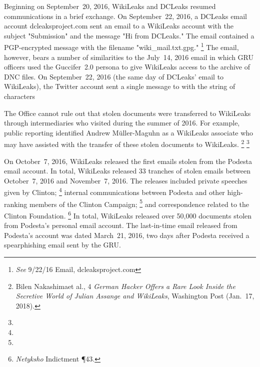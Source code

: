 Beginning on September~20, 2016, WikiLeaks and DCLeaks resumed communications in a brief exchange.
On September~22, 2016, a DCLeaks email account dcleaksproject\@gmail.com sent an email to a WikiLeaks account with the subject "Submission" and the message "Hi from DCLeaks."
The email contained a PGP-encrypted message with the filename "wiki\_mail.txt.gpg."%
\footnote{\textit{See} 9/22/16 Email, dcleaksproject\@gmail.com }
The email, however, bears a number of similarities to the July~14, 2016 email in which GRU officers used the Guccifer~2.0 persona to give WikiLeaks access to the archive of DNC files.
On September~22, 2016 (the same day of DCLeaks' email to WikiLeaks), the Twitter account \@dcleaks sent a single message to \@WikiLeaks with the string of characters 

The Office cannot rule out that stolen documents were transferred to WikiLeaks through intermediaries who visited during the summer of 2016.
For example, public reporting identified Andrew M{\"u}ller-Maguhn as a WikiLeaks associate who may have assisted with the transfer of these stolen documents to WikiLeaks.%
\footnote{Bilen Nakashimaet al., 4 \textit{German Hacker Offers a Rare Look Inside the Secretive World of Julian Assange and WikiLeaks}, Washington Post (Jan.~17, 2018).}
\footnote{}

On October~7, 2016, WikiLeaks released the first emails stolen from the Podesta email account.
In total, WikiLeaks released 33 tranches of stolen emails between October~7, 2016 and November~7, 2016.
The releases included private speeches given by Clinton;%
\footnote{}
internal communications between Podesta and other high-ranking members of the Clinton Campaign;%
\footnote{}
and correspondence related to the Clinton Foundation.%
\footnote{\textit{Netyksho} Indictment \P 43.}
In total, WikiLeaks released over 50,000 documents stolen from Podesta's  personal email account.
The last-in-time email released from Podesta's account was dated March~21, 2016, two days after Podesta received a spearphishing email sent by the GRU\null.

